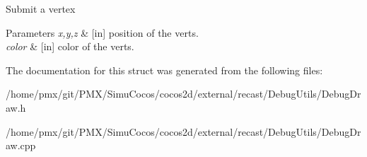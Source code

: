 Submit a vertex 
\begin{DoxyParams}{Parameters}
{\em x,y,z} & \mbox{[}in\mbox{]} position of the verts. \\
\hline
{\em color} & \mbox{[}in\mbox{]} color of the verts. \\
\hline
\end{DoxyParams}


The documentation for this struct was generated from the following files\+:\begin{DoxyCompactItemize}
\item 
/home/pmx/git/\+P\+M\+X/\+Simu\+Cocos/cocos2d/external/recast/\+Debug\+Utils/Debug\+Draw.\+h\item 
/home/pmx/git/\+P\+M\+X/\+Simu\+Cocos/cocos2d/external/recast/\+Debug\+Utils/Debug\+Draw.\+cpp\end{DoxyCompactItemize}
